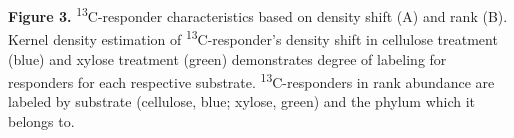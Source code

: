 \textbf{Figure 3.}  \textsuperscript{13}C-responder characteristics based on density shift (A) and rank (B). Kernel density estimation of \textsuperscript{13}C-responder's density shift in cellulose treatment (blue) and xylose treatment (green) demonstrates degree of labeling for responders for each respective substrate. \textsuperscript{13}C-responders in rank abundance are labeled by substrate (cellulose, blue; xylose, green) and the phylum which it belongs to.  